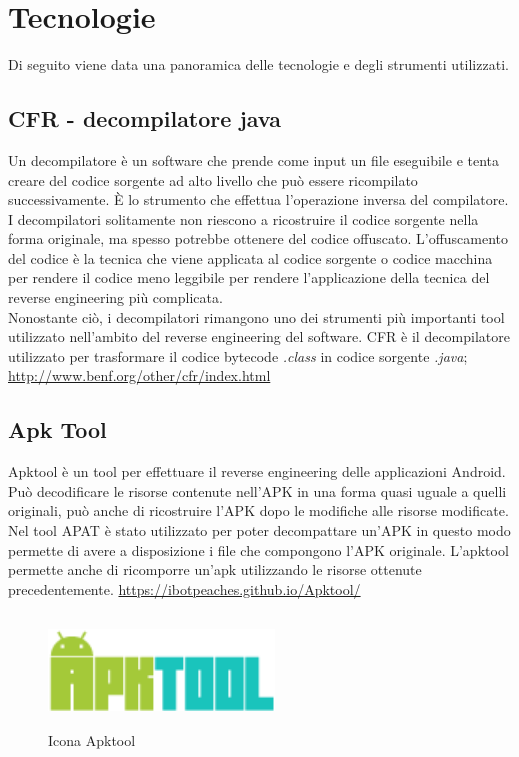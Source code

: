 
\section{Tecnologie}\label{sec:tecnologie}
Di seguito viene data una panoramica delle tecnologie e degli strumenti utilizzati.

\subsection*{CFR - decompilatore java}
Un decompilatore è un software che prende come input un file eseguibile e tenta creare del codice sorgente ad alto livello che può essere ricompilato successivamente.
\`{E} lo strumento che effettua l'operazione inversa del compilatore.
I decompilatori solitamente non riescono a ricostruire il codice sorgente nella forma originale, ma spesso potrebbe ottenere del codice offuscato.
L'offuscamento del codice è la tecnica che viene applicata al codice sorgente o codice macchina per rendere il codice meno leggibile per rendere l'applicazione della tecnica del reverse engineering più complicata.\\
Nonostante ciò, i decompilatori rimangono uno dei strumenti più importanti tool utilizzato nell'ambito del reverse engineering del software.
CFR è il decompilatore utilizzato per trasformare il codice bytecode \textit{.class} in codice sorgente \textit{.java};
\url{http://www.benf.org/other/cfr/index.html}

\subsection*{Apk Tool}
Apktool è un tool per effettuare il reverse engineering delle applicazioni Android.
Può decodificare le risorse contenute nell'APK in una forma quasi uguale a quelli originali, può anche di ricostruire l'APK dopo le modifiche alle risorse modificate.
Nel tool APAT è stato utilizzato per poter decompattare un'APK in questo modo permette di avere a disposizione i file che compongono l'APK originale.
L'apktool permette anche di ricomporre un'apk utilizzando le risorse ottenute precedentemente.
\url{https://ibotpeaches.github.io/Apktool/}
\begin{figure}[H]
    \centering
    \includegraphics[width=6cm, height=3cm]{./immagini/apktool.png}
    \caption{Icona Apktool}\label{fig:apktool}
\end{figure}

